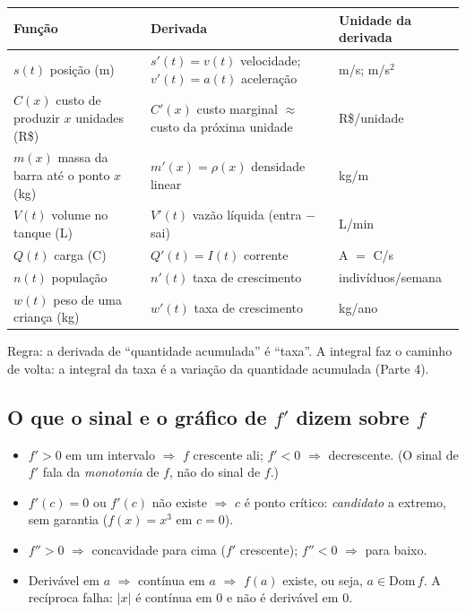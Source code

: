 \begin{definicao}
\small
\begin{tabular}{@{}>{\raggedright\arraybackslash}p{4.9cm}>{\raggedright\arraybackslash}p{7.3cm}>{\raggedright\arraybackslash}p{3.1cm}@{}}
\toprule
\textbf{Função} & \textbf{Derivada} & \textbf{Unidade da derivada}\\
\midrule
$s(t)$ posição (m) & $s'(t)=v(t)$ velocidade; $v'(t)=a(t)$ aceleração & m/s; m/s$^2$\\
$C(x)$ custo de produzir $x$ unidades (R\$) & $C'(x)$ custo marginal $\approx$ custo da próxima unidade & R\$/unidade\\
$m(x)$ massa da barra até o ponto $x$ (kg) & $m'(x)=\rho(x)$ densidade linear & kg/m\\
$V(t)$ volume no tanque (L) & $V'(t)$ vazão líquida (entra $-$ sai) & L/min\\
$Q(t)$ carga (C) & $Q'(t)=I(t)$ corrente & A $=$ C/s\\
$n(t)$ população & $n'(t)$ taxa de crescimento & indivíduos/semana\\
$w(t)$ peso de uma criança (kg) & $w'(t)$ taxa de crescimento & kg/ano\\
\bottomrule
\end{tabular}

\smallskip
Regra: a derivada de ``quantidade acumulada'' é ``taxa''. A integral faz o caminho de volta: a integral da taxa é a variação da quantidade acumulada (Parte 4).
\end{definicao}

\subsection{O que o sinal e o gráfico de $f'$ dizem sobre $f$}

\begin{itemize}[leftmargin=1.4em, itemsep=2pt]
\item $f'>0$ em um intervalo $\Rightarrow$ $f$ crescente ali; $f'<0$ $\Rightarrow$ decrescente. (O sinal de $f'$ fala da \emph{monotonia} de $f$, não do sinal de $f$.)
\item $f'(c)=0$ ou $f'(c)$ não existe $\Rightarrow$ $c$ é ponto crítico: \emph{candidato} a extremo, sem garantia ($f(x)=x^3$ em $c=0$).
\item $f''>0$ $\Rightarrow$ concavidade para cima ($f'$ crescente); $f''<0$ $\Rightarrow$ para baixo.
\item Derivável em $a$ $\Rightarrow$ contínua em $a$ $\Rightarrow$ $f(a)$ existe, ou seja, $a\in \mathrm{Dom}\,f$. A recíproca falha: $|x|$ é contínua em $0$ e não é derivável em $0$.
\end{itemize}

